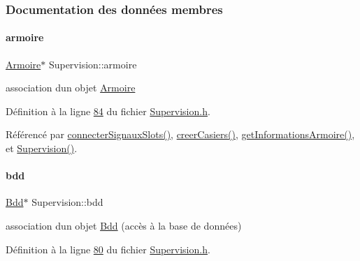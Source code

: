 \subsubsection{Documentation des données membres}
\mbox{\label{class_supervision_a9f974b5c47899192395e539a0f11034c}} 
\paragraph{\texorpdfstring{armoire}{armoire}}
{\footnotesize\ttfamily \hyperlink{class_armoire}{Armoire}$\ast$ Supervision\+::armoire\hspace{0.3cm}{\ttfamily [private]}}



association d\textquotesingle{}un objet \hyperlink{class_armoire}{Armoire} 



Définition à la ligne \hyperlink{_supervision_8h_source_l00084}{84} du fichier \hyperlink{_supervision_8h_source}{Supervision.\+h}.



Référencé par \hyperlink{_supervision_8cpp_source_l00273}{connecter\+Signaux\+Slots()}, \hyperlink{_supervision_8cpp_source_l00090}{creer\+Casiers()}, \hyperlink{_supervision_8cpp_source_l00111}{get\+Informations\+Armoire()}, et \hyperlink{_supervision_8cpp_source_l00036}{Supervision()}.

\mbox{\label{class_supervision_ac9a970d4f511f2eed5da4aed037533ab}} 
\paragraph{\texorpdfstring{bdd}{bdd}}
{\footnotesize\ttfamily \hyperlink{class_bdd}{Bdd}$\ast$ Supervision\+::bdd\hspace{0.3cm}{\ttfamily [private]}}



association d\textquotesingle{}un objet \hyperlink{class_bdd}{Bdd} (accès à la base de données) 



Définition à la ligne \hyperlink{_supervision_8h_source_l00080}{80} du fichier \hyperlink{_supervision_8h_source}{Supervision.\+h}.



